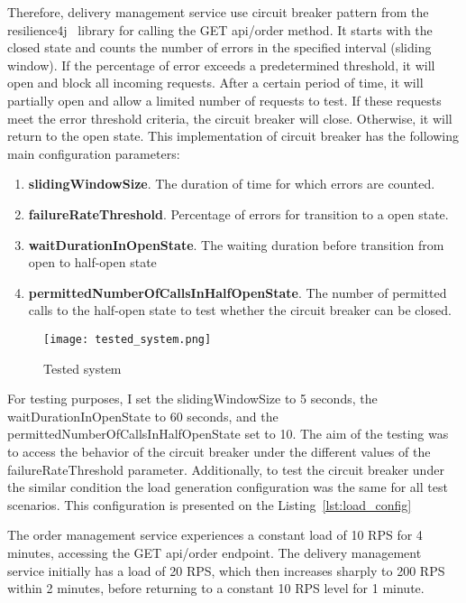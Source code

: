 Therefore, delivery management service use circuit breaker pattern from the resilience4j~\cite{resilience4j} library for calling the GET api/order method. It starts with the closed state and counts the number of errors in the specified interval (sliding window). If the percentage of error exceeds a predetermined threshold, it will open and block all incoming requests. After a certain period of time, it will partially open and allow a limited number of requests to test. If these requests meet the error threshold criteria, the circuit breaker will close. Otherwise, it will return to the open state. This implementation of circuit breaker has the following main configuration parameters:
\begin{enumerate}
    \item \textbf{slidingWindowSize}. The duration of time for which errors are counted.
    \item \textbf{failureRateThreshold}. Percentage of errors for transition to a open state.
    \item \textbf{waitDurationInOpenState}. The waiting duration before transition from open to half-open state
    \item \textbf{permittedNumberOfCallsInHalfOpenState}. The number of permitted calls to the half-open state to test whether the circuit breaker can be closed.
\end{enumerate}

\begin{figure}[t]
    \centering
    \texttt{[image: tested\_system.png]}
    \caption{Tested system}
    \label{fig:tested-system}
\end{figure}


For testing purposes, I set the slidingWindowSize to 5 seconds, the waitDurationInOpenState to 60 seconds, and the permittedNumberOfCallsInHalfOpenState set to 10. The aim of the testing was to access the behavior of the circuit breaker under the different values of the failureRateThreshold parameter. Additionally, to test the circuit breaker under the similar condition the load generation configuration was the same for all test scenarios. This configuration is presented on the Listing~\ref{lst:load_config}

The order management service experiences a constant load of 10 RPS for 4 minutes, accessing the GET api/order endpoint.
The delivery management service initially has a load of 20 RPS, which then increases sharply to 200 RPS within 2 minutes, before returning to a constant 10 RPS level for 1 minute.

